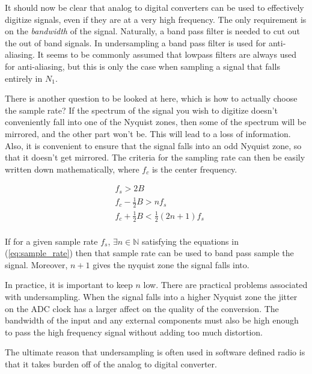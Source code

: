 \documentclass[a4paper, 12pt]{article}
\begin{document}
It should now be clear that analog to digital converters can be used to effectively digitize signals, even if they are at a very high frequency.  The only requirement is on the \textit{bandwidth} of the signal.  Naturally, a band pass filter is needed to cut out the out of band signals.  In undersampling a band pass filter is used for anti-aliasing. It seems to be commonly assumed that lowpass filters are always used for anti-aliasing, but this is only the case when sampling a signal that falls entirely in $N_1$.

There is another question to be looked at here, which is how to actually choose the sample rate?  If the spectrum of the signal you wish to digitize doesn't conveniently fall into one of the Nyquist zones, then some of the spectrum will be mirrored, and the other part won't be.  This will lead to a loss of information.  Also, it is convenient to ensure that the signal falls into an odd Nyquist zone, so that it doesn't get mirrored.  The criteria for the sampling rate can then be easily written down mathematically, where $f_c$ is the center frequency.

\begin{equation}
\label{eq:sample_rate}
\begin{aligned}
  &f_s > 2B \\
  &f_c - \frac{1}{2}B > nf_s \\
  &f_c + \frac{1}{2}B < \frac{1}{2}(2n + 1)f_s \\
\end{aligned}
\end{equation}

If for a given sample rate $f_s$, $\exists n \in \mathbb{N}$ satisfying the equations in (\ref{eq:sample_rate}) then that sample rate can be used to band pass sample the signal.  Moreover, $n+1$ gives the nyquist zone the signal falls into.

In practice, it is important to keep $n$ low.  There are practical problems associated with undersampling.  When the signal falls into a higher Nyquist zone the jitter on the ADC clock has a larger affect on the quality of the conversion.  The bandwidth of the input and any external components must also be high enough to pass the high frequency signal without adding too much distortion.

The ultimate reason that undersampling is often used in software defined radio is that it takes burden off of the analog to digital converter.
\end{document}
